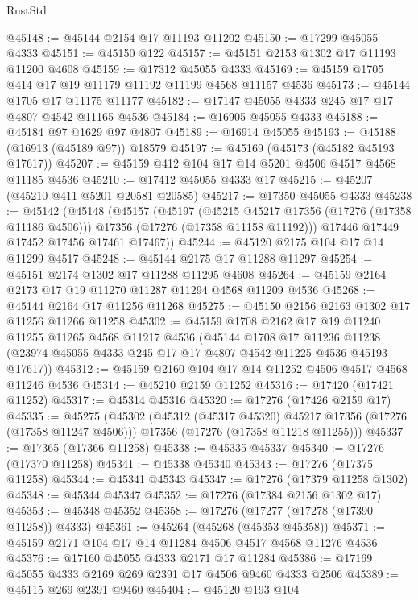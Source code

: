 \begin{lexlean}{RustStd}
\begin{coremodule}
@45148 := @45144 @2154 @17 @11193 @11202
@45150 := @17299 @45055 @4333
@45151 := @45150 @122
@45157 := @45151 @2153 @1302 @17 @11193 @11200 @4608
@45159 := @17312 @45055 @4333
@45169 := @45159 @1705 @414 @17 @19 @11179 @11192 @11199 @4568 @11157 @4536
@45173 := @45144 @1705 @17 @11175 @11177
@45182 := @17147 @45055 @4333 @245 @17 @17 @4807 @4542 @11165 @4536
@45184 := @16905 @45055 @4333
@45188 := @45184 @97 @1629 @97 @4807
@45189 := @16914 @45055
@45193 := @45188 (@16913 (@45189 @97)) @18579
@45197 := @45169 (@45173 (@45182 @45193 @17617))
@45207 := @45159 @412 @104 @17 @14 @5201 @4506 @4517 @4568 @11185 @4536
@45210 := @17412 @45055 @4333 @17
@45215 := @45207 (@45210 @411 @5201 @20581 @20585)
@45217 := @17350 @45055 @4333
@45238 := @45142
    (@45148
      (@45157
        (@45197
          (@45215 @45217 @17356 (@17276 (@17358 @11186 @4506)))
          @17356
          (@17276 (@17358 @11158 @11192)))
        @17446
        @17449
        @17452
        @17456
        @17461
        @17467))
@45244 := @45120 @2175 @104 @17 @14 @11299 @4517
@45248 := @45144 @2175 @17 @11288 @11297
@45254 := @45151 @2174 @1302 @17 @11288 @11295 @4608
@45264 := @45159 @2164 @2173 @17 @19 @11270 @11287 @11294 @4568 @11209 @4536
@45268 := @45144 @2164 @17 @11256 @11268
@45275 := @45150 @2156 @2163 @1302 @17 @11256 @11266 @11258
@45302 := @45159
    @1708
    @2162
    @17
    @19
    @11240
    @11255
    @11265
    @4568
    @11217
    @4536
    (@45144
      @1708
      @17
      @11236
      @11238
      (@23974 @45055 @4333 @245 @17 @17 @4807 @4542 @11225 @4536 @45193 @17617))
@45312 := @45159 @2160 @104 @17 @14 @11252 @4506 @4517 @4568 @11246 @4536
@45314 := @45210 @2159 @11252
@45316 := @17420 (@17421 @11252)
@45317 := @45314 @45316
@45320 := @17276 (@17426 @2159 @17)
@45335 := @45275
    (@45302
      (@45312 (@45317 @45320) @45217 @17356 (@17276 (@17358 @11247 @4506)))
      @17356
      (@17276 (@17358 @11218 @11255)))
@45337 := @17365 (@17366 @11258)
@45338 := @45335 @45337
@45340 := @17276 (@17370 @11258)
@45341 := @45338 @45340
@45343 := @17276 (@17375 @11258)
@45344 := @45341 @45343
@45347 := @17276 (@17379 @11258 @1302)
@45348 := @45344 @45347
@45352 := @17276 (@17384 @2156 @1302 @17)
@45353 := @45348 @45352
@45358 := @17276 (@17277 (@17278 (@17390 @11258)) @4333)
@45361 := @45264 (@45268 (@45353 @45358))
@45371 := @45159 @2171 @104 @17 @14 @11284 @4506 @4517 @4568 @11276 @4536
@45376 := @17160 @45055 @4333 @2171 @17 @11284
@45386 := @17169 @45055 @4333 @2169 @269 @2391 @17 @4506 @9460 @4333 @2506
@45389 := @45115 @269 @2391 @9460
@45404 := @45120
    @193
    @104

\end{coremodule}
\end{lexlean}
